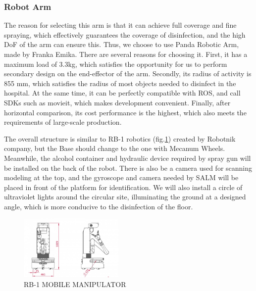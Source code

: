 \subsubsection{Robot Arm}
The reason for selecting this arm is that it can achieve full coverage and fine spraying, which effectively guarantees the coverage of disinfection, and the high DoF of the arm can ensure this. Thus, we choose to use Panda Robotic Arm\cite{gmbh_2021}, made by Franka Emika. There are several reasons for choosing it. First, it has a maximum load of 3.3kg, which satisfies the opportunity for us to perform secondary design on the end-effector of the arm. Secondly, its radius of activity is 855 mm, which satisfies the radius of most objects needed to disinfect in the hospital. At the same time, it can be perfectly compatible with ROS, and call SDKs such as movieit, which makes development convenient. Finally, after horizontal comparison, its cost performance is the highest, which also meets the requirements of large-scale production.\\
\par The overall structure is similar to RB-1 robotics (fig.\ref{rb-1}) created by Robotnik company\cite{rb-1robotnik2021}, but the Base should change to the one with Mecanum Wheels. Meanwhile, the alcohol container and hydraulic device required by spray gun will be installed on the back of the robot. There is also be a camera used for scanning modeling at the top, and the gyroscope and camera needed by SALM will be placed in front of the platform for identification. We will also install a circle of ultraviolet lights around the circular site, illuminating the ground at a designed angle, which is more conducive to the disinfection of the floor.
\begin{figure}[htbp] 
\centering 
\includegraphics[width=0.45\textwidth]{figures/Robotnik-Cotas-RB-1-uai-1440x1387.jpg} 
\caption{RB-1 MOBILE MANIPULATOR} 
\label{rb-1} 
\end{figure}
